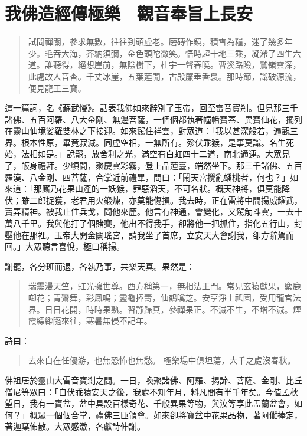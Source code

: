 
\chapter{我佛造經傳極樂　觀音奉旨上長安}

\begin{quote}
試問禪關，參求無數，往往到頭虛老。磨磚作鏡，積雪為糧，迷了幾多年少。毛吞大海，芥納須彌，金色頭陀微笑。悟時超十地三乘，凝滯了四生六道。誰聽得，絕想崖前，無陰樹下，杜宇一聲春曉。曹溪路險，鷲嶺雲深，此處故人音杳。千丈冰崖，五葉蓮開，古殿簾垂香裊。那時節，識破源流，便見龍王三寶。
\end{quote}

這一篇詞，名《蘇武慢》。話表我佛如來辭別了玉帝，回至雷音寶剎。但見那三千諸佛、五百阿羅、八大金剛、無邊菩薩，一個個都執著幢幡寶蓋、異寶仙花，擺列在靈山仙境娑羅雙林之下接迎。如來駕住祥雲，對眾道：「我以甚深般若，遍觀三界。根本性原，畢竟寂滅。同虛空相，一無所有。殄伏乖猴，是事莫識。名生死始，法相如是。」說罷，放舍利之光，滿空有白虹四十二道，南北通連。大眾見了，皈身禮拜。少頃間，聚慶雲彩霧，登上品蓮臺，端然坐下。那三千諸佛、五百羅漢、八金剛、四菩薩，合掌近前禮畢，問曰：「鬧天宮攪亂蟠桃者，何也？」如來道：「那廝乃花果山產的一妖猴，罪惡滔天，不可名狀。概天神將，俱莫能降伏；雖二郎捉獲，老君用火鍛煉，亦莫能傷損。我去時，正在雷將中間揚威耀武，賣弄精神。被我止住兵戈，問他來歷。他言有神通，會變化，又駕觔斗雲，一去十萬八千里。我與他打了個賭賽，他出不得我手，卻將他一把抓住，指化五行山，封壓他在那裡。玉帝大開金闕瑤宮，請我坐了首席，立安天大會謝我，卻方辭駕而回。」大眾聽言喜悅，極口稱揚。

謝罷，各分班而退，各執乃事，共樂天真。果然是：
\begin{quote}
瑞靄漫天竺，虹光擁世尊。西方稱第一，無相法王門。常見玄猿獻果，麋鹿啣花；青鸞舞，彩鳳鳴；靈龜捧壽，仙鶴噙芝。安享淨土祗園，受用龍宮法界。日日花開，時時果熟。習靜歸真，參禪果正。不滅不生，不增不減。煙霞縹緲隨來往，寒暑無侵不記年。
\end{quote}

詩曰：
\begin{quote}
去來自在任優游，也無恐怖也無愁。
極樂場中俱坦蕩，大千之處沒春秋。
\end{quote}

佛祖居於靈山大雷音寶剎之間。一日，喚聚諸佛、阿羅、揭諦、菩薩、金剛、比丘僧尼等眾曰：「自伏乖猿安天之後，我處不知年月，料凡間有半千年矣。今值孟秋望日，我有一寶盆，盆中具設百樣奇花、千般異果等物，與汝等享此盂蘭盆會，如何？」概眾一個個合掌，禮佛三匝領會。如來卻將寶盆中花果品物，著阿儺捧定，著迦葉佈散。大眾感激，各獻詩伸謝。

